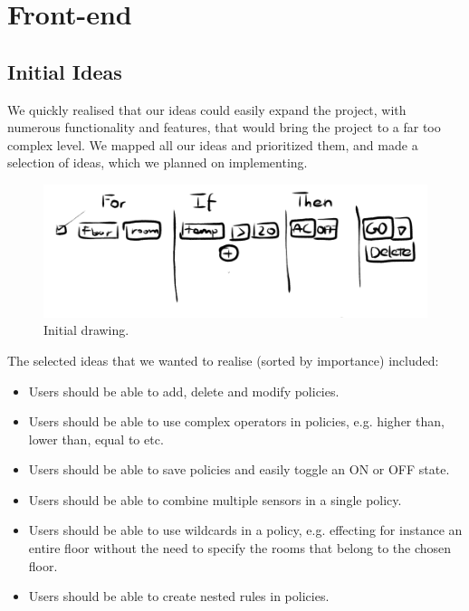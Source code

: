 \section{Front-end}
\label{sec:front-end}

\subsection{Initial Ideas}
We quickly realised that our ideas could easily expand the project, with numerous functionality and features, that would bring the project to a far too complex level.
We mapped all our ideas and prioritized them, and made a selection of ideas, which we planned on implementing.

\begin{figure}[ht]
\centering
\includegraphics[width=\columnwidth]{initial_idea_frontend.png}
\caption{Initial drawing.}
\label{fig:initialidea}
\end{figure}

The selected ideas that we wanted to realise (sorted by importance) included:
\begin{itemize}
\item Users should be able to add, delete and modify policies.
\item Users should be able to use complex operators in policies, e.g. higher than, lower than, equal to etc.
\item Users should be able to save policies and easily toggle an ON or OFF state.
\item Users should be able to combine multiple sensors in a single policy.
\item Users should be able to use wildcards in a policy, e.g. effecting for instance an entire floor without the need to specify the rooms that belong to the chosen floor.
\item Users should be able to create nested rules in policies.
\end{itemize}

